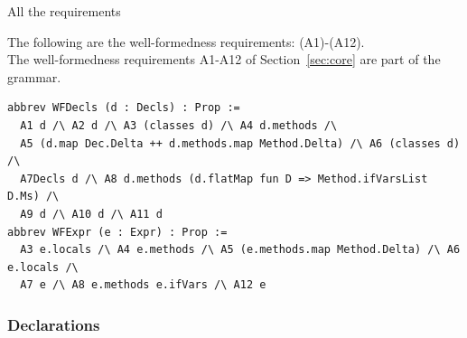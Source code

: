 \begin{cmp}{All the requirements}
\begin{paperside}
The following are the well-formedness requirements: (A1)-(A12).\\[1ex]
The well-formedness requirements A1-A12 of Section~\ref{sec:core} are part of the grammar.
\end{paperside}
\begin{leanside}
\begin{lstlisting}[style=leanside]
abbrev WFDecls (d : Decls) : Prop :=
  A1 d /\ A2 d /\ A3 (classes d) /\ A4 d.methods /\
  A5 (d.map Dec.Delta ++ d.methods.map Method.Delta) /\ A6 (classes d) /\
  A7Decls d /\ A8 d.methods (d.flatMap fun D => Method.ifVarsList D.Ms) /\
  A9 d /\ A10 d /\ A11 d
abbrev WFExpr (e : Expr) : Prop :=
  A3 e.locals /\ A4 e.methods /\ A5 (e.methods.map Method.Delta) /\ A6 e.locals /\
  A7 e /\ A8 e.methods e.ifVars /\ A12 e
\end{lstlisting}
\end{leanside}
\end{cmp}

\subsubsection{Declarations}

